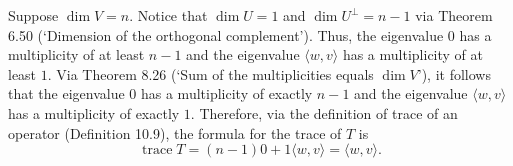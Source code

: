 \documentclass{article}
\begin{document}
Suppose $\operatorname{dim}V=n$. 
Notice that $\operatorname{dim}U=1$ and $\operatorname{dim}U^\bot=n-1$ via Theorem 6.50 (`Dimension of the orthogonal complement'). 
Thus, the eigenvalue $0$ has a multiplicity of at least $n-1$ and the eigenvalue $\langle w,v\rangle$ has a multiplicity of at least $1$. 
Via Theorem 8.26 (`Sum of the multiplicities equals $\operatorname{dim}V$'), it follows that the eigenvalue $0$ has a multiplicity of exactly $n-1$ and the eigenvalue $\langle w,v\rangle$ has a multiplicity of exactly $1$. 
Therefore, via the definition of trace of an operator (Definition 10.9), the formula for the trace of $T$ is
\[\operatorname{trace}T=(n-1)0 + 1\langle w,v\rangle=\langle w,v\rangle.\]
\end{document}

